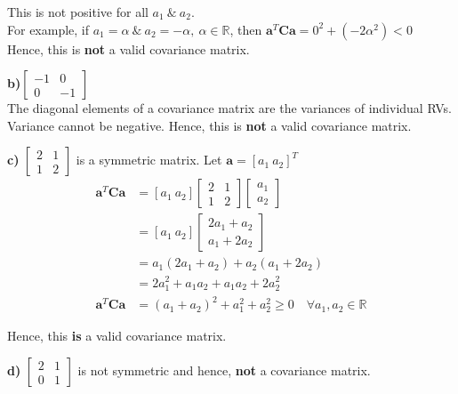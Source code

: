 \documentclass[12pt]{article}
\begin{document}
\noindent
This is not positive for all $a_1 \ \& \ a_2$.\\
For example, if $a_1 = \alpha \ \& \ a_2 = -\alpha, \ \alpha \in \mathbb{R}$, then $\mathbf{a}^T \mathbf{C} \mathbf{a} = 0^2 + (-2\alpha^2) < 0$\\
Hence, this is \textbf{not} a valid covariance matrix.

\vspace{10pt}
\noindent
\textbf{b)}$\begin{bmatrix}-1 & 0 \\ 0 & -1\end{bmatrix}$\\[8pt]
\noindent
The diagonal elements of a covariance matrix are the variances of individual RVs.
Variance cannot be negative. Hence, this is \textbf{not} a valid covariance matrix.

\vspace{10pt}
\noindent
\textbf{c)} $\begin{bmatrix}2 & 1 \\ 1 & 2\end{bmatrix}$ is a symmetric matrix. Let $\mathbf{a} = [a_1\ a_2]^T$\\
\begin{align*}
  \mathbf{a}^T \mathbf{C} \mathbf{a} &= [a_1 \ a_2] \begin{bmatrix}2 & 1 \\ 1 & 2\end{bmatrix} \begin{bmatrix}a_1 \\ a_2\end{bmatrix} \\[8pt]
  &= [a_1 \ a_2] \begin{bmatrix}2a_1 + a_2 \\ a_1 + 2a_2\end{bmatrix} \\[8pt]
  &= a_1(2a_1 + a_2) + a_2(a_1 + 2a_2) \\[8pt]
  &= 2a_1^2 + a_1a_2 + a_1a_2 + 2a_2^2 \\[8pt]
  \mathbf{a}^T \mathbf{C} \mathbf{a} &= (a_1 + a_2)^2 + a_1^2 + a_2^2 \geq 0 \quad \forall a_1, a_2 \in \mathbb{R}
\end{align*}

\noindent
Hence, this \textbf{is} a valid covariance matrix.

\vspace{10pt}
\noindent
\textbf{d)} $\begin{bmatrix}2 & 1 \\ 0 & 1\end{bmatrix}$ is not symmetric and hence, \textbf{not} a covariance matrix.
\end{document}

